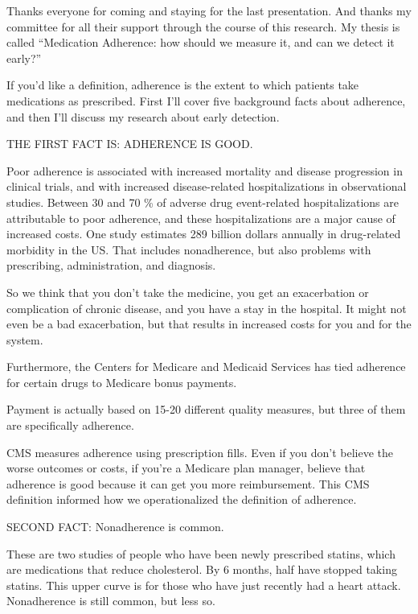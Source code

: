 \documentclass[12pt]{report}
\begin{document}
\begin{large}

Thanks everyone for coming and staying for the last presentation. And
thanks my committee for all their support through the course of this
research. My thesis is called ``Medication Adherence: how should we
measure it, and can we detect it early?''

If you'd like a definition, adherence is the extent to which patients
take medications as prescribed. First I'll cover five background facts
about adherence, and then I'll discuss my research about early
detection.

THE FIRST FACT IS: ADHERENCE IS GOOD.

Poor adherence is associated with increased mortality and disease
progression in clinical trials, and with increased disease-related
hospitalizations in observational studies. Between 30 and 70 \% of
adverse drug event-related hospitalizations are attributable to poor
adherence, and these hospitalizations are a major cause of increased
costs. One study estimates 289 billion dollars annually in
drug-related morbidity in the US. That includes nonadherence, but also
problems with prescribing, administration, and diagnosis.

So we think that you don't take the medicine, you get an exacerbation
or complication of chronic disease, and you have a stay in the
hospital. It might not even be a bad exacerbation, but that results in
increased costs for you and for the system. %

Furthermore, the Centers for Medicare and Medicaid Services has tied
adherence for certain drugs to Medicare bonus payments. 

Payment is actually based on 15-20 different quality measures, but
three of them are specifically adherence. %

CMS measures adherence using prescription fills. Even if you don't
believe the worse outcomes or costs, if you're a Medicare plan
manager, believe that adherence is good because it can get you more
reimbursement. This CMS definition informed how we operationalized the
definition of adherence.

SECOND FACT: Nonadherence is common.

These are two studies of people who have been newly prescribed
statins, which are medications that reduce cholesterol. By 6 months,
half have stopped taking statins. This upper curve is for those who
have just recently had a heart attack. Nonadherence is still common,
but less so.


\end{large}
\end{document}

